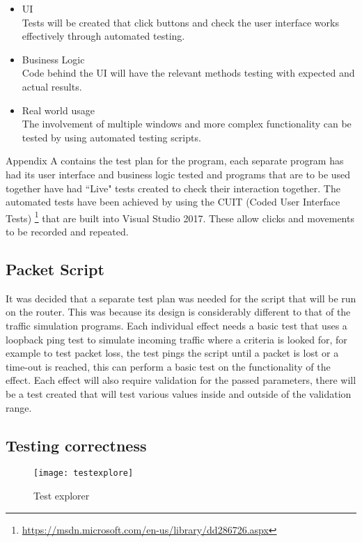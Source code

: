 \begin{itemize}

	\item UI \\
	Tests will be created that click buttons and check the user interface works effectively through automated testing.

	\item Business Logic \\
	Code behind the UI will have the relevant methods testing with expected and actual results.

	\item Real world usage \\
	The involvement of multiple windows and more complex functionality can be tested by using automated testing 			scripts.
	
\end{itemize}

Appendix A contains the test plan for the program, each separate program has had its user interface and business logic tested and programs that are to be used together have had ``Live" tests created to check their interaction together. The automated tests have been achieved by using the CUIT (Coded User Interface Tests) \footnote{\url{https://msdn.microsoft.com/en-us/library/dd286726.aspx}} that are built into Visual Studio 2017. These allow clicks and movements to be recorded and repeated.

\subsection{Packet Script}
It was decided that a separate test plan was needed for the script that will be run on the router. This was because its design is considerably different to that of the traffic simulation programs. Each individual effect needs a basic test that uses a loopback ping test to simulate incoming traffic where a criteria is looked for, for example to test packet loss, the test pings the script until a packet is lost or a time-out is reached, this can perform a basic test on the functionality of the effect. Each effect will also require validation for the passed parameters, there will be a test created that will test various values inside and outside of the validation range.

\subsection{Testing correctness}
\begin{wrapfigure}{r}{5cm}
	\texttt{[image: testexplore]}
	\caption{Test explorer}
	\label{ref:visualstudiotest}
\end{wrapfigure}

